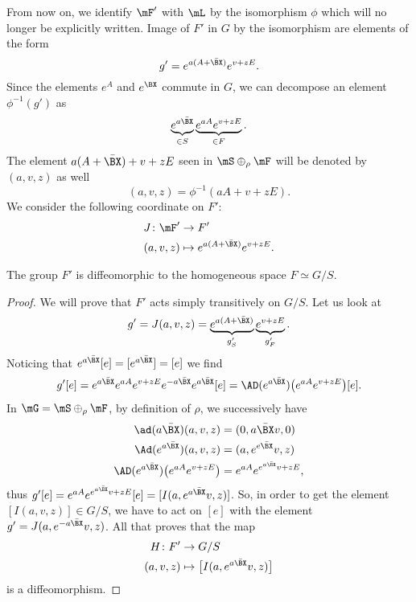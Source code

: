 From now on, we identify $\mF'$ with $\mL$ by the isomorphism $\phi$ which will no longer be explicitly written.  Image of $F'$ in $G$ by the isomorphism are elements of the form
\[
	g'= e^{a(A+\bar{\BX })} e^{v+zE}.
\]
Since the elements $ e^{A}$ and $ e^{\BX }$ commute in $G$, we can decompose an element $\phi^{-1}(g')$ as
\[
	\underbrace{e^{a\bar{\BX }}}_{\in S}\underbrace{e^{aA} e^{v+zE}}_{\in F}.
\]
The element $a(A+\bar{\BX })+v+zE$ seen in $\mS\oplus_{\rho}\mF$ will be denoted by $(a,v,z)$ as well
\[
	(a,v,z)=\phi^{-1}(aA+v+zE).
\]
We consider the following coordinate on $F'$:
\begin{equation}
	\begin{aligned}
		J\colon \mF' & \to F'                                 \\
		(a,v,z)      & \mapsto  e^{a(A+\bar{\BX })} e^{v+zE}.
	\end{aligned}
\end{equation}

\begin{proposition}
	The group $F'$ is diffeomorphic to the homogeneous space $F\simeq G/S$.
\end{proposition}

\begin{proof}
	We will prove that $F'$ acts simply transitively on $G/S$. Let us look at
	\begin{equation}        \label{EqgpJSF}
		g'=J(a,v,z)= \underbrace{e^{a(A+\bar{\BX })}}_{g'_{S}} \underbrace{e^{v+zE}}_{g'_{F}}.
	\end{equation}
	Noticing that $ e^{a\bar{\BX }}[e]=[ e^{a\bar{\BX }}]=[e]$ we find
	\[
		\begin{split}
			g'[e]= e^{a\bar{\BX }} e^{aA} e^{v+zE} e^{-a\bar{\BX }} e^{a\bar{\BX }}[e]
			=\AD( e^{a\bar{\BX }})\big(  e^{aA} e^{v+zE} \big)[e].
		\end{split}
	\]
	In $\mG=\mS\oplus_{\rho}\mF$, by definition of $\rho$, we successively have
	\begin{subequations}
		\begin{align}
			\ad(a\bar{\BX })(a,v,z)                           & =(0,a\bar{\BX }v,0)                \\
			\Ad( e^{a\bar{\BX }})(a,v,z)                      & =(a, e^{e\bar{\BX }}v,z)           \\
			\AD( e^{a\bar{\BX }})\big(  e^{aA} e^{v+zE} \big) & = e^{aA} e^{ e^{a\bar{\BX }}v+zE},
		\end{align}
	\end{subequations}
	thus $g'[e]= e^{aA} e^{ e^{a\bar{\BX }}v+zE}[e]=[I(a, e^{a\bar{\BX }}v,z)]$. So, in order to get the element $[I(a,v,z)]\in G/S$, we have to act on $[e]$ with the element $g'=J(a, e^{-a\bar{\BX }}v,z)$. All that proves that the map
	\begin{equation}
		\begin{aligned}
			H\colon F' & \to G/S                                      \\
			(a,v,z)    & \mapsto \big[ I(a, e^{a\bar{\BX }}v,z) \big]
		\end{aligned}
	\end{equation}
	is a diffeomorphism.
\end{proof}

